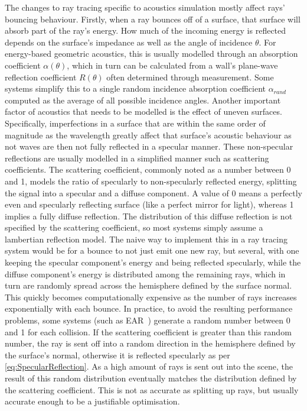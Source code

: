 The changes to ray tracing specific to acoustics simulation mostly affect rays' bouncing behaviour.
Firstly, when a ray bounces off of a surface,
that surface will absorb part of the ray's energy.
How much of the incoming energy is reflected depends on the surface's impedance
as well as the angle of incidence \(\theta\).
\newline
For energy-based geometric acoustics, this is usually modelled through an absorption coefficient \(\alpha(\theta)\),
which in turn can be calculated from a wall's plane-wave reflection coefficient \(R(\theta)\) often determined through measurement.
Some systems simplify this to a single random incidence absorption coefficient \(\alpha_{rand}\)
computed as the average of all possible incidence angles.
\newline
Another important factor of acoustics that needs to be modelled is the effect of uneven surfaces.
Specifically, imperfections in a surface that are within the same order of magnitude as the wavelength greatly affect that surface's acoustic behaviour
as not waves are then not fully reflected in a specular manner.
These non-specular reflections are usually modelled in a simplified manner such as scattering coefficients.
\newline
The scattering coefficient, commonly noted as a number between 0 and 1, models the ratio of specularly to non-specularly reflected energy,
splitting the signal into a specular and a diffuse component.
A value of 0 means a perfectly even and specularly reflecting surface (like a perfect mirror for light),
whereas 1 implies a fully diffuse reflection.
\newline
The distribution of this diffuse reflection is not specified by the scattering coefficient,
so most systems simply assume a lambertian reflection model.
\newline
The naive way to implement this in a ray tracing system would be for a bounce to not just emit one new ray, but several,
with one keeping the specular component's energy and being reflected specularly,
while the diffuse component's energy is distributed among the remaining rays,
which in turn are randomly spread across the hemisphere defined by the surface normal.
This quickly becomes computationally expensive as the number of rays increases exponentially with each bounce.
\newline
In practice, to avoid the resulting performance problems,
some systems (such as EAR~\cite{Th17}) generate a random number between 0 and 1 for each collision.
If the scattering coefficient is greater than this random number,
the ray is sent off into a random direction in the hemisphere defined by the surface's normal,
otherwise it is reflected specularly as per \ref{eq:SpecularReflection}.
As a high amount of rays is sent out into the scene,
the result of this random distribution eventually matches the distribution defined by the scattering coefficient.
This is not as accurate as splitting up rays,
but usually accurate enough to be a justifiable optimisation.

